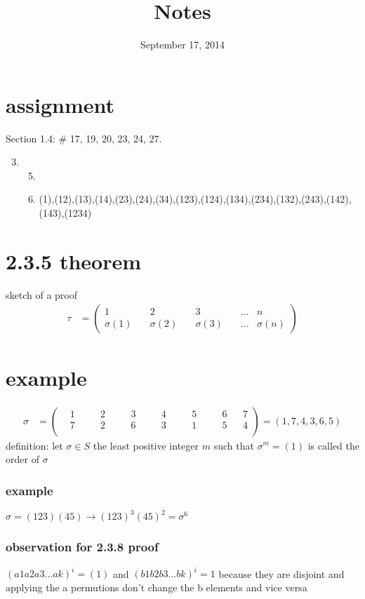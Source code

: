\documentclass[letterpaper]{article}
\begin{document}
\title{Notes}
\date{September 17, 2014}
\maketitle
\section*{assignment}
Section 1.4: \# 17, 19, 20, 23, 24, 27. 
\renewcommand{\labelenumi}{2.\arabic{enumi}}
\renewcommand{\labelenumii}{\arabic{enumii}.}
\renewcommand{\labelenumiii}{(\alph{enumiii})}
\begin{enumerate}
\setcounter{enumi}{2}
\item
  \begin{enumerate}
  \setcounter{enumii}{4}
  \item
  
  \item
  (1),(12),(13),(14),(23),(24),(34),(123),(124),(134),(234),(132),(243),(142),(143),(1234)
  \end{enumerate}
\end{enumerate}

\section*{2.3.5 theorem}
sketch of a proof
\begin{align*}
  \tau&=\left(
  \begin{aligned}
    1&\quad2&\quad3&\quad\dots& n\\
    \sigma(1)&\quad\sigma(2)&\quad\sigma(3)&\quad\dots&\sigma(n)
  \end{aligned}
  \right)
\end{align*}
\section*{example}
\begin{align*}
  \sigma&=\left(
  \begin{aligned}
    &1&&\quad2&&\quad3&&\quad4&&\quad5&&\quad6&&7\\
    &7&&\quad2&&\quad6&&\quad3&&\quad1&&\quad5&&4\\
  \end{aligned}
  \right)=(1,7,4,3,6,5)
\end{align*}
definition: let $\sigma\in S$ the least positive integer $m$ such that $\sigma^m=(1)$ is called the order of $\sigma$
\subsubsection*{example}
$\sigma=(123)(45)\to(123)^3(45)^2=\sigma^6$
\subsubsection*{observation for 2.3.8 proof}
$(a1a2a3\dots ak)^i=(1)$ and $(b1b2b3\dots bk)^i=1$ because they are disjoint and applying the a permutions don't change the b elements and vice versa
\end{document}
